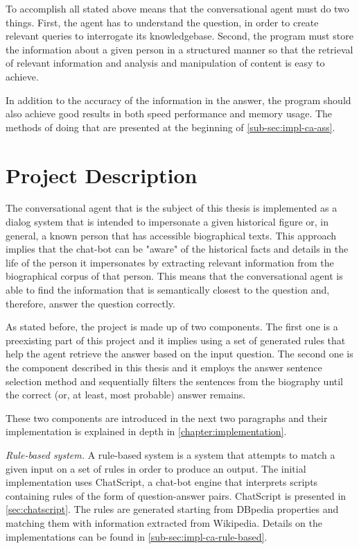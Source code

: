 To accomplish all stated above means that the conversational agent must do two things. First, the agent has to understand the question, in order to create relevant queries to interrogate its knowledgebase. Second, the program must store the information about a given person in a structured manner so that the retrieval of relevant information and analysis and manipulation of content is easy to achieve.

In addition to the accuracy of the information in the answer, the program should also achieve good results in both speed performance and memory usage. The methods of doing that are presented at the beginning of \autoref{sub-sec:impl-ca-ass}.

\section{Project Description}
\label{sec:project-description}

The conversational agent that is the subject of this thesis is implemented as a dialog system that is intended to impersonate a given historical figure or, in general, a known person that has accessible biographical texts. This approach implies that the chat-bot can be "aware" of the historical facts and details in the life of the person it impersonates by extracting relevant information from the biographical corpus of that person. This means that the conversational agent is able to find the information that is semantically closest to the question and, therefore, answer the question correctly.

As stated before, the project is made up of two components. The first one is a preexisting part of this project and it implies using a set of generated rules that help the agent retrieve the answer based on the input question. The second one is the component described in this thesis and it employs the answer sentence selection method and sequentially filters the sentences from the biography until the correct (or, at least, most probable) answer remains.

These two components are introduced in the next two paragraphs and their implementation is explained in depth in \autoref{chapter:implementation}.

{\em Rule-based system.} A rule-based system is a system that attempts to match a given input on a set of rules in order to produce an output. The initial implementation uses ChatScript, a chat-bot engine that interprets scripts containing rules of the form of question-answer pairs. ChatScript is presented in \autoref{sec:chatscript}. The rules are generated starting from DBpedia properties and matching them with information extracted from Wikipedia. Details on the implementations can be found in \autoref{sub-sec:impl-ca-rule-based}.

